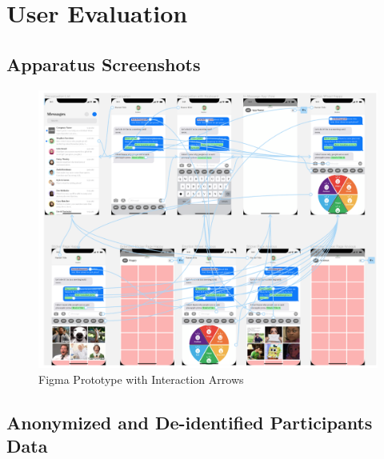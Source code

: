 \documentclass[acmsmall,screen,authorversion,nonacm]{acmart}
\begin{document}
\section{User Evaluation}

\subsection{Apparatus Screenshots}
\begin{figure}[H]
\begin{center}
\includegraphics[width=1.0\linewidth]{figures/Figma_Prototype.png}
\caption{Figma Prototype with Interaction Arrows}
\label{fig:figmaprototype2}
\Description{}
\end{center}
\end{figure}

\subsection{Anonymized and De-identified Participants Data}
\label{final_pro_data}
\end{document}
